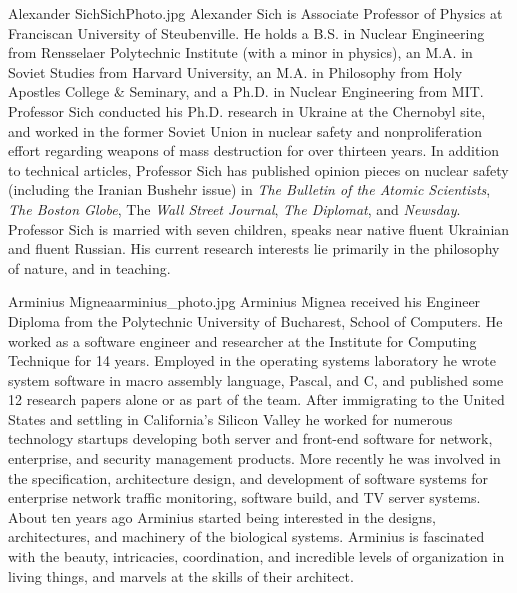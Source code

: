 
\begin{authorbio}{Alexander Sich}{SichPhoto.jpg}{}
Alexander Sich is Associate Professor of Physics at Franciscan University of Steubenville. He holds a B.S. in Nuclear Engineering from Rensselaer Polytechnic Institute (with a minor in physics), an M.A. in Soviet Studies from Harvard University, an M.A. in Philosophy from Holy Apostles College \& Seminary, and a Ph.D. in Nuclear Engineering from MIT.  Professor Sich conducted his Ph.D. research in Ukraine at the Chernobyl site, and worked in the former Soviet Union in nuclear safety and nonproliferation effort regarding weapons of mass destruction for over thirteen years. In addition to technical articles, Professor Sich has published opinion pieces on nuclear safety (including the Iranian Bushehr issue) in \emph{The Bulletin of the Atomic Scientists}, \emph{The Boston Globe}, The \emph{Wall Street Journal}, \emph{The Diplomat}, and \emph{Newsday}. Professor Sich is married with seven children, speaks near native fluent Ukrainian and fluent Russian. His current research interests lie primarily in the philosophy of nature, and in teaching.
\end{authorbio}

\begin{authorbio}{Arminius Mignea}{arminius_photo.jpg}{}
Arminius Mignea received his Engineer Diploma from the Polytechnic University of Bucharest, School of Computers. He worked as a software engineer and researcher at the Institute for Computing Technique for 14 years. Employed in the operating systems laboratory he wrote system software in macro assembly language, Pascal, and C, and published some 12 research papers alone or as part of the team. After immigrating to the United States and settling in California's Silicon Valley he worked for numerous technology startups developing both server and front-end software for network, enterprise, and security management products. More recently he was involved in the specification, architecture design, and development of software systems for enterprise network traffic monitoring, software build, and TV server systems. About ten years ago Arminius started being interested in the designs, architectures, and machinery of the biological systems. Arminius is fascinated with the beauty, intricacies, coordination, and incredible levels of organization in living things, and marvels at the skills of their architect.
\end{authorbio}

